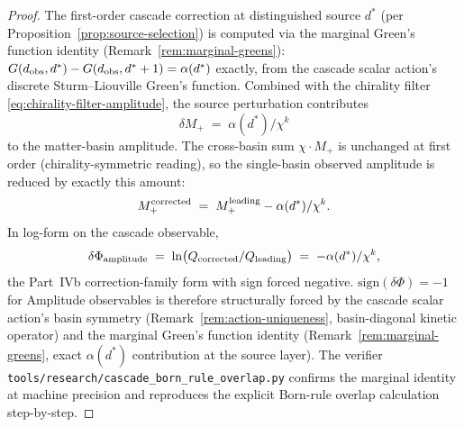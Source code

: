 \documentclass[12pt,a4paper]{article}
\begin{document}
\begin{proof}
The first-order cascade correction at distinguished source $d^*$
(per Proposition~\ref{prop:source-selection}) is computed via the
marginal Green's function identity (Remark~\ref{rem:marginal-greens}):
$G(d_{\rm obs},d^*) - G(d_{\rm obs},d^*+1) = \alpha(d^*)$ exactly,
from the cascade scalar action's discrete Sturm--Liouville Green's
function. Combined with the chirality filter
\eqref{eq:chirality-filter-amplitude}, the source perturbation
contributes
\[
\delta M_+ \;=\; \alpha(d^*)/\chi^k
\]
to the matter-basin amplitude. The cross-basin sum $\chi\cdot M_+$
is unchanged at first order (chirality-symmetric reading), so the
single-basin observed amplitude is reduced by exactly this amount:
\[
M_+^{\rm corrected}\;=\;M_+^{\rm leading} - \alpha(d^*)/\chi^k.
\]
In log-form on the cascade observable,
\[
\delta\Phi_{\rm amplitude}
\;=\;\ln\bigl(Q_{\rm corrected}/Q_{\rm leading}\bigr)
\;=\;-\alpha(d^*)/\chi^k,
\]
the Part~IVb correction-family form with sign forced negative.
$\mathrm{sign}(\delta\Phi)=-1$ for Amplitude observables is therefore
structurally forced by the cascade scalar action's basin symmetry
(Remark~\ref{rem:action-uniqueness}, basin-diagonal kinetic operator)
and the marginal Green's function identity
(Remark~\ref{rem:marginal-greens}, exact $\alpha(d^*)$ contribution
at the source layer). The verifier
\texttt{tools/research/cascade\_born\_rule\_overlap.py} confirms
the marginal identity at machine precision and reproduces the
explicit Born-rule overlap calculation step-by-step.
\end{proof}
\end{document}
